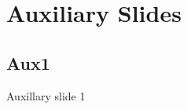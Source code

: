 \documentclass{beamer}
\begin{document}
\appendix
\section{Auxiliary Slides}


\subsection{Aux1}
%
\begin{frame}{Auxillary slide 1}

\end{frame}
%
%
%
%
%
%
%
%
%
\end{document}
